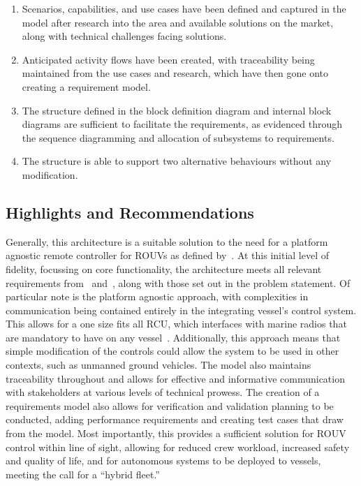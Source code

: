 \documentclass[../main.tex]{subfiles}
\begin{document}
\begin{enumerate}
    \item{} Scenarios, capabilities, and use cases have been defined and captured in the model after research into the area and available solutions on the market, along with technical challenges facing solutions.
    \item{} Anticipated activity flows have been created, with traceability being maintained from the use cases and research, which have then gone onto creating a requirement model.
    \item{} The structure defined in the block definition diagram and internal block diagrams are sufficient to facilitate the requirements, as evidenced through the sequence diagramming and allocation of subsystems to requirements.
    \item{} The structure is able to support two alternative behaviours without any modification.

\end{enumerate}

\subsection{Highlights and Recommendations}

Generally, this architecture is a suitable solution to the need for a platform agnostic remote controller for ROUVs as defined by~\cite{WBC3}.
At this initial level of fidelity, focussing on core functionality, the architecture meets all relevant requirements from~\cite{WBC3} and~\cite{COLREGS1972}, along with those set out in the problem statement.
Of particular note is the platform agnostic approach, with complexities in communication being contained entirely in the integrating vessel's control system.
This allows for a one size fits all RCU, which interfaces with marine radios that are mandatory to have on any vessel~\cite{WBC3}.
Additionally, this approach means that simple modification of the controls could allow the system to be used in other contexts, such as unmanned ground vehicles.
The model also maintains traceability throughout and allows for effective and informative communication with stakeholders at various levels of technical prowess.
The creation of a requirements model also allows for verification and validation planning to be conducted, adding performance requirements and creating test cases that draw from the model.
Most importantly, this provides a sufficient solution for ROUV control within line of sight, allowing for reduced crew workload, increased safety and quality of life, and for autonomous systems to be deployed to vessels, meeting the call for a ``hybrid fleet.''\cite{Jenkins2025}
\end{document}
